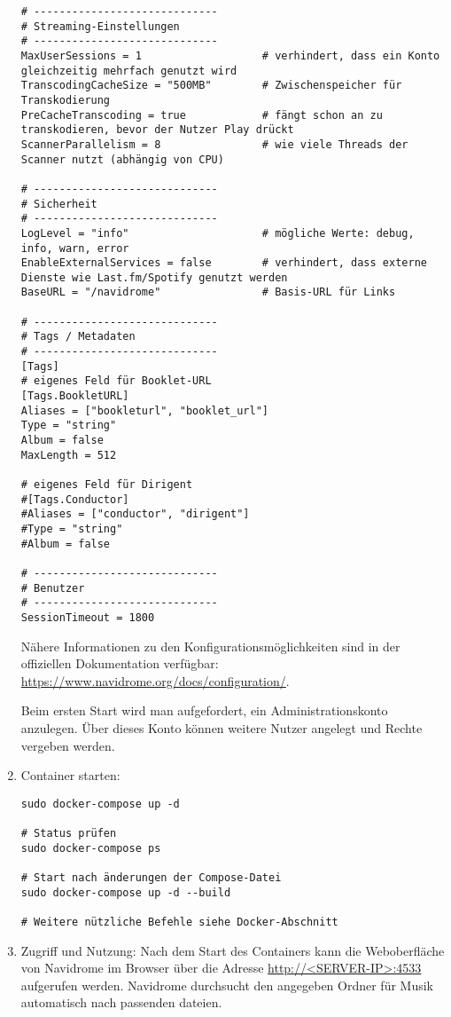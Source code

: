 \documentclass[12pt,a4paper]{report}
\begin{document}
\begin{enumerate}
\begin{verbatim}
# -----------------------------
# Streaming-Einstellungen
# -----------------------------
MaxUserSessions = 1                   # verhindert, dass ein Konto gleichzeitig mehrfach genutzt wird
TranscodingCacheSize = "500MB"        # Zwischenspeicher für Transkodierung
PreCacheTranscoding = true            # fängt schon an zu transkodieren, bevor der Nutzer Play drückt
ScannerParallelism = 8                # wie viele Threads der Scanner nutzt (abhängig von CPU)

# -----------------------------
# Sicherheit
# -----------------------------
LogLevel = "info"                     # mögliche Werte: debug, info, warn, error
EnableExternalServices = false        # verhindert, dass externe Dienste wie Last.fm/Spotify genutzt werden
BaseURL = "/navidrome"                # Basis-URL für Links

# -----------------------------
# Tags / Metadaten
# -----------------------------
[Tags]
# eigenes Feld für Booklet-URL
[Tags.BookletURL]
Aliases = ["bookleturl", "booklet_url"]
Type = "string"
Album = false
MaxLength = 512

# eigenes Feld für Dirigent
#[Tags.Conductor]
#Aliases = ["conductor", "dirigent"]
#Type = "string"
#Album = false

# -----------------------------
# Benutzer
# -----------------------------
SessionTimeout = 1800
    \end{verbatim}

    Nähere Informationen zu den Konfigurationsmöglichkeiten sind in der offiziellen Dokumentation verfügbar: \url{https://www.navidrome.org/docs/configuration/}.
    
    Beim ersten Start wird man aufgefordert, ein Administrationskonto anzulegen.
    Über dieses Konto können weitere Nutzer angelegt und Rechte vergeben werden.

    \item Container starten:
    \begin{verbatim}
sudo docker-compose up -d

# Status prüfen
sudo docker-compose ps

# Start nach änderungen der Compose-Datei
sudo docker-compose up -d --build

# Weitere nützliche Befehle siehe Docker-Abschnitt
    \end{verbatim}

    \item Zugriff und Nutzung:
    Nach dem Start des Containers kann die Weboberfläche von Navidrome im Browser über die Adresse \url{http://<SERVER-IP>:4533} aufgerufen werden.   
    Navidrome durchsucht den angegeben Ordner für Musik automatisch nach passenden dateien.  
  

\end{enumerate}
\end{document}
